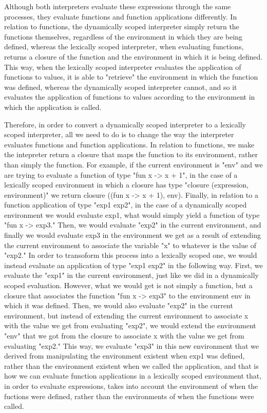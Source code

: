 \documentclass[a4paper]{article}
\begin{document}
Although both interpreters evaluate these expressions through the same processes, they evaluate functions and function applications differently. In relation to functions, the dynamically scoped interpreter simply return the functions themselves, regardless of the environment in which they are being defined, whereas the lexically scoped interpreter, when evaluating functions, returns a closure of the function and the environment in which it is being defined. This way, when the lexically scoped interpreter evaluates the application of functions to values, it is able to "retrieve" the environment in which the function was defined, whereas the dynamically scoped interpreter cannot, and so it evaluates the application of functions to values according to the environment in which the application is called.

Therefore, in order to convert a dynamically scoped interpreter to a lexically scoped interpreter, all we need to do is to change the way the interpreter evaluates functions and function applications. In relation to functions, we make the intepreter return a closure that maps the function to its environment, rather than simply the function. For example, if the current environment is "env" and we are trying to evaluate a function of type "fun x -> x + 1", in the case of a lexically scoped environment in which a closure has type "closure (expression, environment)" we return closure ((fun x -> x + 1), env). Finally, in relation to a function application of type "exp1 exp2", in the case of a dynamically scoped environment we would evaluate exp1, what would simply yield a function of type "fun x -> exp3." Then, we would evaluate "exp2" in the current environment, and finally we would evaluate exp3 in the environment we get as a result of  extending the current environment to associate the variable "x" to whatever is the value of "exp2." In order to transoform this process into a lexically scoped one, we would instead evaluate an application of type "exp1 exp2" in the following way. First, we evaluate the "exp1" in the current environment, just like we did in a dynamically scoped evaluation. However, what we would get is not simply a function, but a closure that associates the function "fun x -> exp3" to the environment env in which it was defined. Then, we would also evaluate "exp2" in the current environment, but instead of extending the current environment to associate x with the value we get from evaluating "exp2", we would extend the environment "env" that we got from the closure to associate x with the value we get from evaluating "exp2." This way, we evaluate "exp3" in this new environment that we derived from manipulating the environment  existent when exp1 was defined, rather than the environment existent when we called the application, and that is how we can evaluate function applications in a lexically scoped environment that, in order to evaluate expressions, takes into account the environment of when the fuctions were defined, rather than the environments of when the functions were called.
\end{document}
